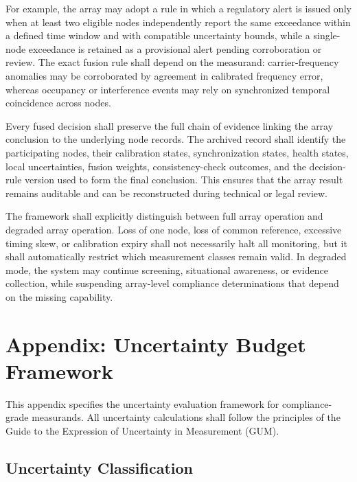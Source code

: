 \documentclass[11pt]{report}
\begin{document}
\begin{description}
	For example, the array may adopt a rule in which a regulatory alert is issued only when at least two eligible nodes independently report the same exceedance within a defined time window and with compatible uncertainty bounds, while a single-node exceedance is retained as a provisional alert pending corroboration or review. The exact fusion rule shall depend on the measurand: carrier-frequency anomalies may be corroborated by agreement in calibrated frequency error, whereas occupancy or interference events may rely on synchronized temporal coincidence across nodes.
	\item[Array-level traceability and evidence.] Every fused decision shall preserve the full chain of evidence linking the array conclusion to the underlying node records. The archived record shall identify the participating nodes, their calibration states, synchronization states, health states, local uncertainties, fusion weights, consistency-check outcomes, and the decision-rule version used to form the final conclusion. This ensures that the array result remains auditable and can be reconstructed during technical or legal review.
	\item[Degraded-mode operation.] The framework shall explicitly distinguish between full array operation and degraded array operation. Loss of one node, loss of common reference, excessive timing skew, or calibration expiry shall not necessarily halt all monitoring, but it shall automatically restrict which measurement classes remain valid. In degraded mode, the system may continue screening, situational awareness, or evidence collection, while suspending array-level compliance determinations that depend on the missing capability.
\end{description}

\newpage
\appendix
\section*{Appendix: Uncertainty Budget Framework}\label{app:uncertainty-budget}

\noindent This appendix specifies the uncertainty evaluation framework for compliance-grade measurands. All uncertainty calculations shall follow the principles of the Guide to the Expression of Uncertainty in Measurement (GUM).

\subsection*{Uncertainty Classification}
\end{document}
